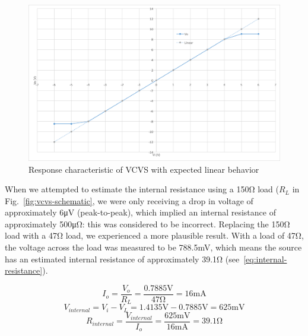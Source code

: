 \begin{figure}
	\centering
	\includegraphics[width=0.7\linewidth]{graphics/vcvs-graph}
	\caption{Response characteristic of VCVS with expected linear behavior}
	\label{fig:vcvs-graph}
\end{figure}

When we attempted to estimate the internal resistance using a 150\si{\ohm} load ($R_L$ in Fig.~\ref{fig:vcvs-schematic}, we were only receiving a drop in voltage of approximately 6\si{\micro\volt} (peak-to-peak), which implied an internal resistance of approximately 500\si{\micro\ohm}: this was considered to be incorrect. Replacing the 150\si{\ohm} load with a 47\si{\ohm} load, we experienced a more plausible result. With a load of 47\si{\ohm}, the voltage across the load was measured to be 788.5\si{\milli\volt}, which means the source has an estimated internal resistance of approximately 39.1\si{\ohm} (see~\ref{eq:internal-resistance}).

\begin{equation}
	I_o	= \frac{V_o}{R_L} = \frac{0.7885\si{\volt}}{47\si{\ohm}} = 16\si{\milli\ampere}
\end{equation}
\begin{equation}
	V_{internal}		= V_i - V_L = 1.4135\si{\volt} - 0.7885\si{\volt} = 625\si{\milli\volt}
\end{equation}
\begin{equation}
	\label{eq:internal-resistance}
	R_{internal}	= \frac{V_{internal}}{I_o} = \frac{625\si{\milli\volt}}{16\si{\milli\ampere}} = 39.1\si{\ohm}
\end{equation}


